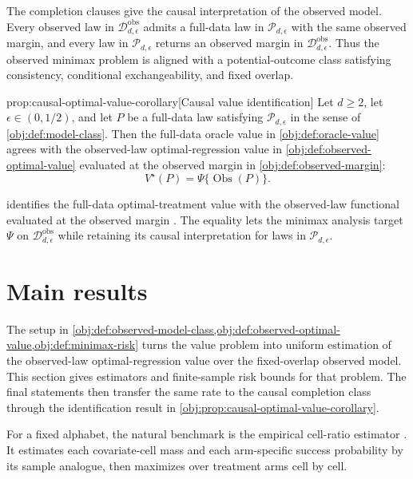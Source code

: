 \documentclass[11pt]{article}
\begin{document}
The completion clauses give the causal interpretation of the observed model. Every observed law in \(\mathcal D_{d,\epsilon}^{\mathrm{obs}}\) admits a full-data law in \(\mathcal P_{d,\epsilon}\) with the same observed margin, and every law in \(\mathcal P_{d,\epsilon}\) returns an observed margin in \(\mathcal D_{d,\epsilon}^{\mathrm{obs}}\). Thus the observed minimax problem is aligned with a potential-outcome class satisfying consistency, conditional exchangeability, and fixed overlap.

\begin{propositionv}{prop:causal-optimal-value-corollary}[Causal value identification]
Let \(d\ge 2\), let \(\epsilon\in(0,1/2)\), and let \(P\) be a full-data law satisfying \(\mathcal P_{d,\epsilon}\) in the sense of \cref{obj:def:model-class}. Then the full-data oracle value in \cref{obj:def:oracle-value} agrees with the observed-law optimal-regression value in \cref{obj:def:observed-optimal-value} evaluated at the observed margin in \cref{obj:def:observed-margin}:
\[
V^\star(P)=\Psi\{\operatorname{Obs}(P)\}.
\]
\end{propositionv}

 identifies the full-data optimal-treatment value  with the observed-law functional evaluated at the observed margin . The equality lets the minimax analysis target \(\Psi\) on \(\mathcal D_{d,\epsilon}^{\mathrm{obs}}\) while retaining its causal interpretation for laws in \(\mathcal P_{d,\epsilon}\).


\section{Main results}

The setup in \cref{obj:def:observed-model-class,obj:def:observed-optimal-value,obj:def:minimax-risk} turns the value problem into uniform estimation of the observed-law optimal-regression value over the fixed-overlap observed model. This section gives estimators and finite-sample risk bounds for that problem. The final statements then transfer the same rate to the causal completion class through the identification result in \cref{obj:prop:causal-optimal-value-corollary}.

For a fixed alphabet, the natural benchmark is the empirical cell-ratio estimator . It estimates each covariate-cell mass and each arm-specific success probability by its sample analogue, then maximizes over treatment arms cell by cell.
\end{document}
